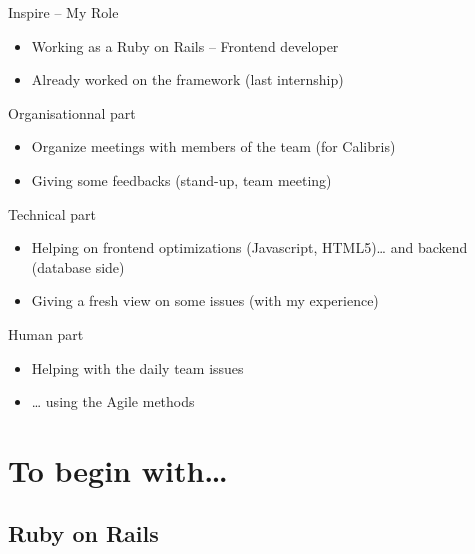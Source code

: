 \documentclass[10pt,a4paper]{beamer}
\begin{document}
\begin{frame}{Inspire -- My Role}

  \begin{itemize}
    \item Working as a Ruby on Rails -- Frontend developer
    \item Already worked on the framework (last internship)
  \end{itemize}
  
  \begin{block}{Organisationnal part}
    \begin{itemize}
      \item Organize meetings with members of the team (for Calibris)
      \item Giving some feedbacks (stand-up, team meeting)
    \end{itemize}
  \end{block}
  
  \begin{block}{Technical part}
    \begin{itemize}
      \item Helping on frontend optimizations (Javascript, HTML5)… and backend (database side)
      \item Giving a fresh view on some issues (with my experience)
    \end{itemize}
  \end{block}
  
  \begin{block}{Human part}
    \begin{itemize}
      \item Helping with the daily team issues
      \item … using the Agile methods
    \end{itemize}
  \end{block}
\end{frame}

\section{To begin with…}

\subsection{Ruby on Rails}
\end{document}
